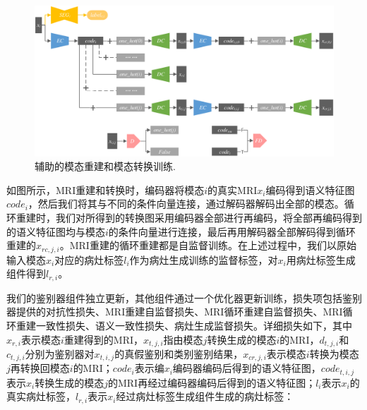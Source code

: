 \documentclass[letterpaper]{article} %
\begin{document}
\begin{figure}
	\centering
	\includegraphics[width=0.98\columnwidth]{figures/trans_train}
	\caption{辅助的模态重建和模态转换训练.}
	\label{trans_train}
\end{figure}

如图所示，MRI重建和转换时，编码器将模态$i$的真实MRI$x_i$编码得到语义特征图$code_{i}$，然后我们将其与不同的条件向量连接，通过解码器解码出全部的模态。循环重建时，我们对所得到的转换图采用编码器全部进行再编码，将全部再编码得到的语义特征图均与模态$i$的条件向量进行连接，最后再用解码器全部解码得到循环重建的$x_{rc,j,i}$。MRI重建的循环重建都是自监督训练。在上述过程中，我们以原始输入模态$x_i$对应的病灶标签$l_i$作为病灶生成训练的监督标签，对$x_i$用病灶标签生成组件得到$l_{r,i}$。

我们的鉴别器组件独立更新，其他组件通过一个优化器更新训练，损失项包括鉴别器提供的对抗性损失、MRI重建自监督损失、MRI循环重建自监督损失、MRI循环重建一致性损失、语义一致性损失、病灶生成监督损失。详细损失如下，其中$x_{r,i}$表示模态$i$重建得到的MRI，$x_{t,j,i}$指由模态$j$转换生成的模态$i$的MRI，$d_{t,j,i}$和$c_{t,j,i}$分别为鉴别器对$x_{t,i,j}$的真假鉴别和类别鉴别结果，$x_{cr,j,i}$表示模态$i$转换为模态$j$再转换回模态$i$的MRI；$code_i$表示编$x_i$编码器编码后得到的语义特征图，$code_{t,i,j}$表示$x_i$转换生成的模态$j$的MRI再经过编码器编码后得到的语义特征图；$l_i$表示$x_i$的真实病灶标签，$l_{r,i}$表示$x_i$经过病灶标签生成组件生成的病灶标签：
\end{document}
